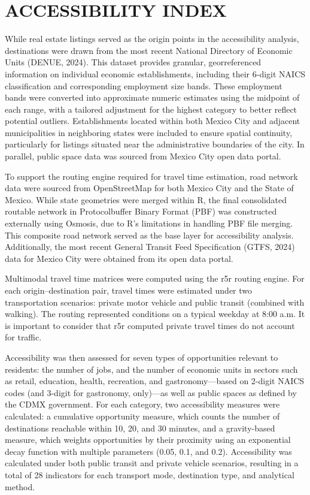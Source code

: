 \documentclass[
  12pt,
]{report}
\begin{document}
\section{ACCESSIBILITY INDEX}\label{accessibility-index}

While real estate listings served as the origin points in the
accessibility analysis, destinations were drawn from the most recent
National Directory of Economic Units (DENUE, 2024). This dataset
provides granular, georreferenced information on individual economic
establishments, including their 6-digit NAICS classification and
corresponding employment size bands. These employment bands were
converted into approximate numeric estimates using the midpoint of each
range, with a tailored adjustment for the highest category to better
reflect potential outliers. Establishments located within both Mexico
City and adjacent municipalities in neighboring states were included to
ensure spatial continuity, particularly for listings situated near the
administrative boundaries of the city. In parallel, public space data
was sourced from Mexico City open data portal.

To support the routing engine required for travel time estimation, road
network data were sourced from OpenStreetMap for both Mexico City and
the State of Mexico. While state geometries were merged within R, the
final consolidated routable network in Protocolbuffer Binary Format
(PBF) was constructed externally using Osmosis, due to R's limitations
in handling PBF file merging. This composite road network served as the
base layer for accessibility analysis. Additionally, the most recent
General Transit Feed Specification (GTFS, 2024) data for Mexico City
were obtained from its open data portal.

Multimodal travel time matrices were computed using the r5r routing
engine. For each origin--destination pair, travel times were estimated
under two transportation scenarios: private motor vehicle and public
transit (combined with walking). The routing represented conditions on a
typical weekday at 8:00 a.m. It is important to consider that r5r
computed private travel times do not account for traffic.

Accessibility was then assessed for seven types of opportunities
relevant to residents: the number of jobs, and the number of economic
units in sectors such as retail, education, health, recreation, and
gastronomy---based on 2-digit NAICS codes (and 3-digit for gastronomy,
only)---as well as public spaces as defined by the CDMX government. For
each category, two accessibility measures were calculated: a cumulative
opportunity measure, which counts the number of destinations reachable
within 10, 20, and 30 minutes, and a gravity-based measure, which
weights opportunities by their proximity using an exponential decay
function with multiple parameters (0.05, 0.1, and 0.2). Accessibility
was calculated under both public transit and private vehicle scenarios,
resulting in a total of 28 indicators for each transport mode,
destination type, and analytical method.
\end{document}
